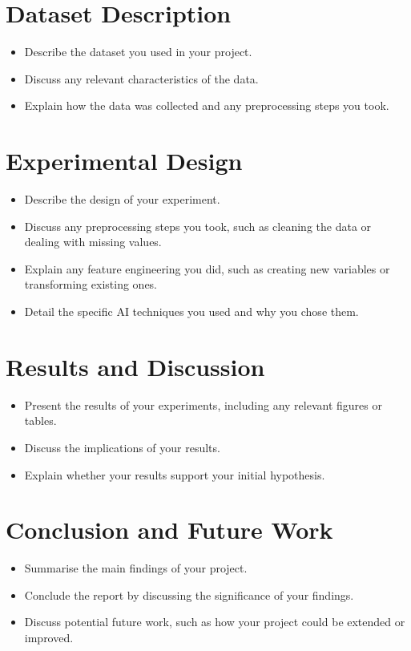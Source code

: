 \documentclass{article}
\begin{document}
\section{Dataset Description}
\label{sec:dataset_description}
\begin{itemize}
    \item Describe the dataset you used in your project.
    \item Discuss any relevant characteristics of the data.
    \item Explain how the data was collected and any preprocessing steps you
          took.
\end{itemize}

\section{Experimental Design}
\label{sec:experimental_design}
\begin{itemize}
    \item Describe the design of your experiment.
    \item Discuss any preprocessing steps you took, such as cleaning the data
          or
          dealing with missing values.
    \item Explain any feature engineering you did, such as creating new
          variables
          or transforming existing ones.
    \item Detail the specific AI techniques you used and why you chose them.
\end{itemize}

\section{Results and Discussion}
\label{sec:results_and_discussion}
\begin{itemize}
    \item Present the results of your experiments, including any relevant
          figures
          or tables.
    \item Discuss the implications of your results.
    \item Explain whether your results support your initial hypothesis.
\end{itemize}

\section{Conclusion and Future Work}
\label{sec:conclusion_and_future_work}
\begin{itemize}
    \item Summarise the main findings of your project.
    \item Conclude the report by discussing the significance of your findings.
    \item Discuss potential future work, such as how your project could be
          extended
          or improved.
\end{itemize}
\end{document}
